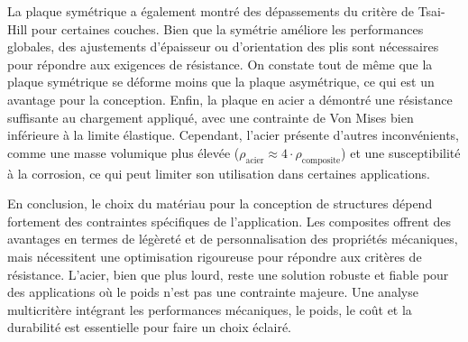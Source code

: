 \documentclass[a4paper,12pt]{article}
\begin{document}
La plaque symétrique a également montré des dépassements du critère de Tsai-Hill pour certaines couches. Bien que la symétrie améliore les performances globales, des ajustements d'épaisseur ou d'orientation des plis sont nécessaires pour répondre aux exigences de résistance. On constate tout de même que la plaque symétrique se déforme moins que la plaque asymétrique, ce qui est un avantage pour la conception.
Enfin, la plaque en acier a démontré une résistance suffisante au chargement appliqué, avec une contrainte de Von Mises bien inférieure à la limite élastique. Cependant, l'acier présente d'autres inconvénients, comme une masse volumique plus élevée ($\rho_{\text{acier}} \approx 4 \cdot \rho_{\text{composite}}$) et une susceptibilité à la corrosion, ce qui peut limiter son utilisation dans certaines applications.

En conclusion, le choix du matériau pour la conception de structures dépend fortement des contraintes spécifiques de l'application. Les composites offrent des avantages en termes de légèreté et de personnalisation des propriétés mécaniques, mais nécessitent une optimisation rigoureuse pour répondre aux critères de résistance. L'acier, bien que plus lourd, reste une solution robuste et fiable pour des applications où le poids n'est pas une contrainte majeure. Une analyse multicritère intégrant les performances mécaniques, le poids, le coût et la durabilité est essentielle pour faire un choix éclairé.
\end{document}
